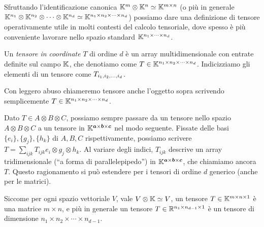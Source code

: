 \begin{remark}
	Sfruttando l'identificazione canonica $ \mathbb{K}^m \otimes \mathbb{K}^n \simeq \mathbb{K}^{m \times n} $ (o più in
	generale $ \mathbb{K}^{n_1}\otimes \mathbb{K}^{n_2} \otimes \cdots \otimes \mathbb{K}^{n_{d}} \simeq \mathbb{K}^{n_1 \times n_2 \times
			\cdots \times n_{d}}$) possiamo dare una definizione di tensore operativamente utile in molti contesti del
	calcolo tensoriale, dove spesso è più conveniente lavorare nello spazio standard $ \mathbb{K}^{n_1 \times
			\cdots \times n_{d}} $.


\end{remark}
\begin{definition}
	Un \emph{tensore in coordinate} $ T  $ di ordine $ d $ è un array multidimensionale con entrate definite sul campo $
		\mathbb{K} $, che denotiamo come $  T \in \Kmsiz{\K} $. Indicizziamo gli elementi di un tensore come
	$ T_{\miwc} $.
\end{definition}
\begin{warning}
	Con leggero abuso chiameremo tensore anche l'oggetto sopra scrivendo
	semplicemente $ T \in \mathbb{K}^{n_1 \times n_2 \times \cdots \times n_{d}} $.
\end{warning}
\begin{remark}
	Dato $ T \in A \otimes B \otimes C $, possiamo sempre passare da un tensore nello spazio $ A
		\otimes B \otimes C $ a un tensore in $ \mathbb{K}^{\bm{a} \times \bm{b} \times \bm{c}} $ nel modo seguente. Fissate
	delle basi $ \{e_{i}\}, \{g_{j}\}, \{h_{k}\}    $ di $ A, B, C $ rispettivamente, possiamo
	scrivere $ T = \sum_{ijk} T_{ijk} e_{i} \otimes g_{j} \otimes h_{k} $. Al variare degli indici, $
		T_{ijk} $ descrive un array tridimensionale (``a forma di parallelepipedo'') in $ \mathbb{K}^{\bm{a}
			\times \bm{b} \times \bm{c}} $, che chiamiamo ancora $ T $. Questo ragionamento si può
	estendere per i tensori di ordine $ d $ generico (anche per le matrici).
\end{remark}
\begin{remark}
	Siccome per ogni spazio vettoriale $ V $, vale $ V \otimes \mathbb{K} \simeq V $, un tensore $ T \in \mathbb{K}^{m \times n\times 1} $ è una matrice $ m \times n $, e più in generale
	un tensore $ T \in \mathbb{R}^{n_1\times n_{d-1} \times 1} $ è un tensore di dimensione $ n_1\times
		n_2\times \cdots \times  n_{d-1} $.
\end{remark}


